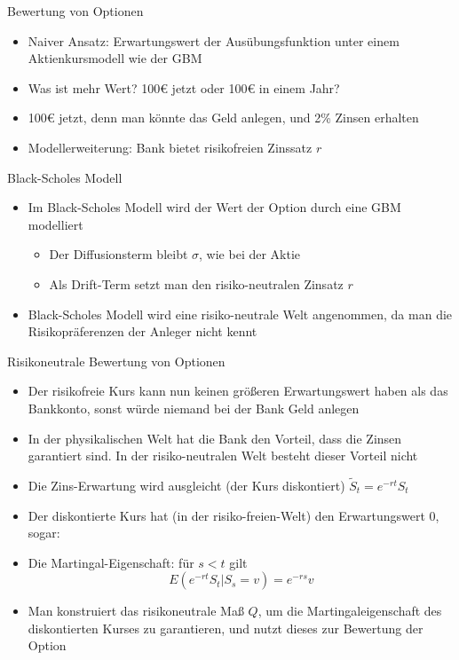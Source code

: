 \documentclass{beamer}
\begin{document}
\begin{frame}{Bewertung von Optionen}
  \begin{itemize}
      \item Naiver Ansatz: Erwartungswert der Ausübungsfunktion unter einem Aktienkursmodell wie der GBM
      \pause
      \item Was ist mehr Wert? 100€ jetzt oder 100€ in einem Jahr?
      \pause
      \item 100€ jetzt, denn man könnte das Geld anlegen, und 2\% Zinsen erhalten
      \item Modellerweiterung: Bank bietet risikofreien Zinssatz $r$
  \end{itemize}
\end{frame}

\begin{frame}{Black-Scholes Modell}
  \begin{itemize}
      \item Im Black-Scholes Modell wird der Wert der Option durch eine GBM modelliert
      \begin{itemize}
        \item Der Diffusionsterm bleibt $\sigma$, wie bei der Aktie
        \item Als Drift-Term setzt man den risiko-neutralen Zinsatz $r$
      \end{itemize}
      \item Black-Scholes Modell wird eine risiko-neutrale Welt angenommen, da man die Risikopräferenzen der Anleger nicht kennt
  \end{itemize}
\end{frame}

\begin{frame}{Risikoneutrale Bewertung von Optionen}
  \begin{itemize}
      \item Der risikofreie Kurs kann nun keinen größeren Erwartungswert haben als das Bankkonto, sonst würde niemand bei der Bank Geld anlegen
      \item In der physikalischen Welt hat die Bank den Vorteil, dass die Zinsen garantiert sind. In der risiko-neutralen Welt besteht dieser Vorteil nicht 
      \pause
      \item Die Zins-Erwartung wird ausgleicht (der Kurs diskontiert) $\tilde S_t = e^{-r t} S_t$
      \item Der diskontierte Kurs hat (in der risiko-freien-Welt) den Erwartungswert $0$, sogar:
      \item Die Martingal-Eigenschaft: für $s < t$ gilt $$E(e^{-rt}S_t | S_s = v) = e^{-rs} v$$
      \pause
      \item Man konstruiert das risikoneutrale Maß $Q$, um die Martingaleigenschaft des diskontierten Kurses zu garantieren, und nutzt dieses zur Bewertung der Option
  \end{itemize}
\end{frame}
\end{document}
